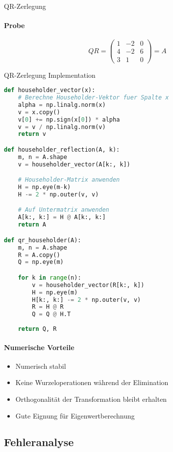 \begin{example2}[breakable]{QR-Zerlegung}
\paragraph{Probe}
\vspace{-2mm}
$$QR = \begin{pmatrix}
1 & -2 & 0\\
4 & -2 & 6\\
3 & 1 & 0
\end{pmatrix} = A$$
\end{example2}

\begin{examplecode}{QR-Zerlegung Implementation}
\begin{lstlisting}[language=Python, style=basesmol]
def householder_vector(x):
    # Berechne Householder-Vektor fuer Spalte x
    alpha = np.linalg.norm(x)
    v = x.copy()
    v[0] += np.sign(x[0]) * alpha
    v = v / np.linalg.norm(v)
    return v

def householder_reflection(A, k):
    m, n = A.shape
    v = householder_vector(A[k:, k])

    # Householder-Matrix anwenden
    H = np.eye(m-k)
    H -= 2 * np.outer(v, v)

    # Auf Untermatrix anwenden
    A[k:, k:] = H @ A[k:, k:]
    return A

def qr_householder(A):
    m, n = A.shape
    R = A.copy()
    Q = np.eye(m)

    for k in range(n):
        v = householder_vector(R[k:, k])
        H = np.eye(m)
        H[k:, k:] -= 2 * np.outer(v, v)
        R = H @ R
        Q = Q @ H.T
    
    return Q, R
\end{lstlisting}

\paragraph{Numerische Vorteile}
\begin{itemize}
    \item Numerisch stabil
    \item Keine Wurzeloperationen während der Elimination
    \item Orthogonalität der Transformation bleibt erhalten
    \item Gute Eignung für Eigenwertberechnung
\end{itemize}
\end{examplecode}

\subsection{Fehleranalyse}

